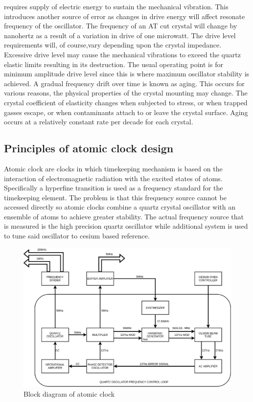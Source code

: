 requires supply of electric energy to sustain the mechanical vibration.
This introduces another source of error as changes in drive energy will affect resonate frequency 
of the oscillator. The frequency of an AT cut crystal will change by nanohertz as a result
of a variation in drive of one microwatt.
The drive level requirements will, of course,vary depending upon the crystal impedance. 
Excessive drive level may cause the mechanical vibrations to exceed the quartz elastic limits 
resulting in its destruction. The usual operating point is for minimum amplitude drive level
since this is where maximum oscillator stability is achieved.
A gradual frequency drift over time is known as aging.
This occurs for various reasons, the physical properties of the crystal mounting may change.
The crystal coefficient of elasticity changes when subjected to stress, or when trapped gasses 
escape, or when contaminants attach to or leave the crystal surface. 
Aging occurs at a relatively constant rate per decade for each crystal.

\subsection{Principles of atomic clock design}
\FloatBarrier
Atomic clock are clocks in which timekeeping mechanism is based on the interaction of 
electromagnetic radiation with the excited states of atoms.
Specifically a hyperfine transition is used as a frequency standard for the timekeeping element.
The problem is that this frequency source cannot be accessed directly so atomic clocks combine 
a quartz crystal oscillator with an ensemble of atoms to achieve greater stability.
The actual frequency source that is measured is the high precision quartz oscillator while 
additional system is used to tune said oscillator to cesium based reference.
\begin{figure} 
	\label{fig:atomic_diagram}
	\centering
	\includegraphics[width=\textwidth]{figures/atomic_diagram}
	\caption{Block diagram of atomic clock}
\end{figure}

